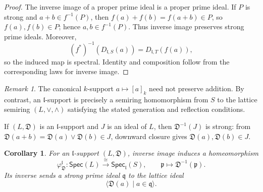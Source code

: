 \documentclass[12pt,leqno]{amsart}
\newcommand{\Spec}{\mathsf{Spec}}
\newcommand{\Specl}{\mathsf{Spec}_{\mathfrak l}}
\newtheorem{corollary}[theorem]{Corollary}
\theoremstyle{definition}
\numberwithin{equation}{section}
\theoremstyle{remark}
\newtheorem{remark}[theorem]{Remark}
\begin{document}
\begin{proof}
The inverse image of a proper prime ideal is a proper prime ideal. If $P$ is strong and \(a+b\in f^{-1}(P)\), then
\(f(a)+f(b)=f(a+b)\in P\), so \(f(a),f(b)\in P\); hence \(a,b\in f^{-1}(P)\). Thus inverse image preserves strong prime ideals. Moreover,
\[
(f^*)^{-1}(D_{\mathfrak l,S}(a))
 =D_{\mathfrak l,T}(f(a)),
\]
so the induced map is spectral. Identity and composition follow from the corresponding laws for inverse image.
\end{proof}

\begin{remark}
The canonical $k$-support \(a\mapsto[a]_k\) need not preserve addition. By contrast, an $\mathfrak l$-support is precisely a semiring homomorphism from $S$ to the lattice semiring \((L,\vee,\wedge)\) satisfying the stated generation and reflection conditions.
\end{remark}

If \((L,\mathfrak D)\) is an $\mathfrak l$-support and $J$ is an ideal of $L$, then \(\mathfrak D^{-1}(J)\) is strong: from
\(\mathfrak D(a+b)=\mathfrak D(a)\vee\mathfrak D(b)\in J\), downward closure gives \(\mathfrak D(a),\mathfrak D(b)\in J\).

\begin{corollary}\label{cor:strong-support-spectrum}
For an $\mathfrak l$-support \((L,\mathfrak D)\), inverse image induces a homeomorphism
\[
\varphi^{\mathfrak l}_{\mathfrak D}\colon\Spec(L)\xrightarrow{\ \cong\ }\Specl(S),
\qquad
\mathfrak p\longmapsto\mathfrak D^{-1}(\mathfrak p).
\]
Its inverse sends a strong prime ideal \(\mathfrak q\) to the lattice ideal
\[
\bigl\langle\mathfrak D(a)\mid a\in\mathfrak q\bigr\rangle.
\]
\end{corollary}
\end{document}
